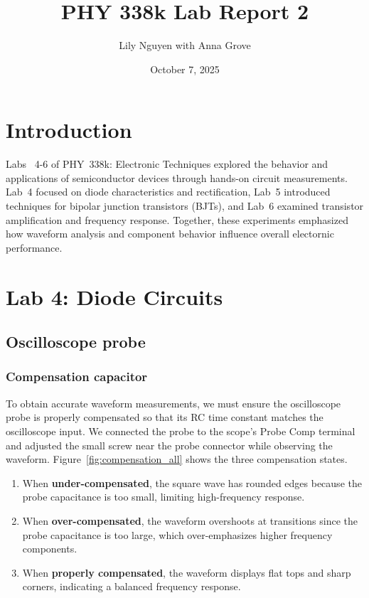 \documentclass{article}
\title{PHY 338k Lab Report 2}
\author{Lily Nguyen with Anna Grove}
\date{October 7, 2025}
\begin{document}
\maketitle

\section*{Introduction}

Labs ~4-6 of PHY~338k: Electronic Techniques explored the behavior and
applications of semiconductor devices through hands-on circuit measurements.
Lab~4 focused on diode characteristics and rectification, Lab~5 introduced
techniques for bipolar junction transistors (BJTs), and Lab~6 examined 
transistor amplification and frequency response. Together, these experiments
emphasized how waveform analysis and component behavior influence overall 
electornic performance.


\section{Lab 4: Diode Circuits}

\subsection{Oscilloscope probe}

\subsubsection{Compensation capacitor}

To obtain accurate waveform measurements, we must ensure the oscilloscope probe
is properly compensated so that its RC time constant matches the oscilloscope
input. We connected the probe to the scope's Probe Comp terminal and adjusted
the small screw near the probe connector while observing the waveform.
Figure~\ref{fig:compensation_all} shows the three compensation states.

\begin{enumerate}
    \item When \textbf{under-compensated}, the square wave has rounded edges
    because the probe capacitance is too small, limiting high-frequency response.
    \item When \textbf{over-compensated}, the waveform overshoots at transitions
    since the probe capacitance is too large, which over-emphasizes higher
    frequency components.
    \item When \textbf{properly compensated}, the waveform displays flat tops
    and sharp corners, indicating a balanced frequency response.
\end{enumerate}
\end{document}
